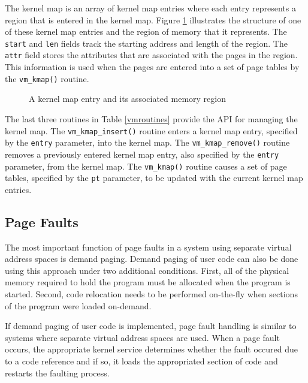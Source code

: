 The kernel map is an array of kernel map entries where
each entry represents a region that is entered in the
kernel map.  Figure \ref{kmap} illustrates the structure
of one of these kernel map entries and the region of
memory that it represents.  The {\tt start} and {\tt len}
fields track the starting address and length of the region.
The {\tt attr} field stores the attributes that are
associated with the pages in the region.  This information
is used when the pages are entered into a set of page
tables by the {\tt vm\_kmap()} routine.

\begin{center}\begin{figure}[h]
\centerline{}
\caption{\label{kmap} A kernel map entry and its associated
memory region}
\end{figure}\end{center}

The last three routines in  Table \ref{vmroutines} provide
the API for managing the kernel map.  The
{\tt vm\_kmap\_insert()} routine enters a kernel map entry,
specified by the {\tt entry} parameter, into the kernel map.
The {\tt vm\_kmap\_remove()} routine removes a previously
entered kernel map entry, also specified by the {\tt entry}
parameter, from the kernel map.  The {\tt vm\_kmap()} routine
causes a set of page tables, specified by the {\tt pt}
parameter, to be updated with the current kernel map entries.


\subsection{Page Faults}

The most important function of page faults in a system
using separate virtual address spaces is demand paging.
Demand paging of user code can also be done using this
approach under two additional conditions.  First, all of
the physical memory required to hold the program must be
allocated when the program is started.  Second, code
relocation needs to be performed on-the-fly when sections
of the program were loaded on-demand.

If demand paging of user code is implemented, page fault
handling is similar to systems where separate virtual
address spaces are used.  When a page fault occurs, the
appropriate kernel service determines whether the fault
occured due to a code reference and if so, it loads the
appropriated section of code and restarts the faulting
process.

